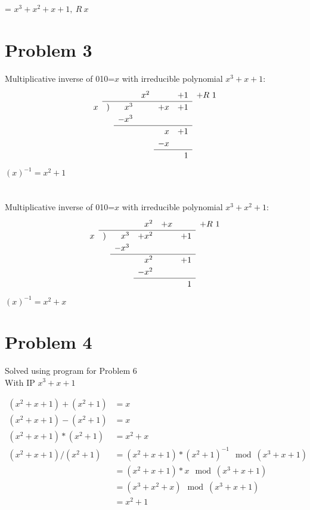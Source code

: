 \documentclass[letterpaper]{article}
\begin{document}
= \(x^3 + x^2 + x + 1,\ R\ x\)

\section{Problem 3}

Multiplicative inverse of 010=$x$ with irreducible polynomial \(x^3 + x + 1\):\\ 
\[\def\arraystretch{1.2}
\begin{array}{rlrrrrr}
&&&x^2&&+1&+R\ 1\\
\cline{2-6}
x&)&x^3&&+x&+1&\\
&&-x^3&&&&\\ \cline{3-6}
&&&&x&+1&\\
&&&&-x&&\\ \cline{5-6}
&&&&&1&
\end{array}
\]
$(x)^{-1} = x^2 + 1$\\~\\
\\
Multiplicative inverse of 010=$x$ with irreducible polynomial \(x^3 + x^2 + 1\):\\%
\[\def\arraystretch{1.2}
\begin{array}{rlrrrrr}
&&&x^2&+x&&+R\ 1\\
\cline{2-6}
x&)&x^3&+x^2&&+1&\\
&&-x^3&&&&\\ \cline{3-6}
&&&x^2&&+1&\\
&&&-x^2&&&\\ \cline{4-6}
&&&&&1&
\end{array}
\]
$(x)^{-1} = x^2 + x$
\section{Problem 4}
Solved using program for Problem 6\\
With IP \(x^3 + x + 1\)

\begin{equation*}
  \begin{split}
    (x^2 + x + 1) + (x^2 + 1) &= x \\
    (x^2 + x + 1) - (x^2 + 1) &= x \\
    (x^2 + x + 1) * (x^2 + 1) &= x^2 + x \\
    (x^2 + x + 1) / (x^2 + 1) &= (x^2 + x + 1) * (x^2 + 1)^{-1} \mod (x^3 + x + 1) \\
    &= (x^2 + x + 1) * x \mod (x^3 + x + 1)\\
    &= (x^3 + x^2 + x) \mod (x^3 + x + 1)\\
    &= x^2 +1
  \end{split}
\end{equation*}
\end{document}
